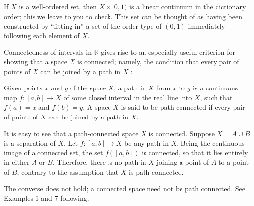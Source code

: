\begin{centeredblock}
\begin{example}
\label{ex:\thesection.\theexample}
 If \(X\) is a well-ordered set, then \(X \times \lbrack 0,1)\) is a linear continuum in the dictionary order; this we leave to you to check. This set can be thought of as having been constructed by ``fitting in'' a set of the order type of \((0,1)\) immediately following each element of \(X\).
\end{example}
\end{centeredblock}

Connectedness of intervals in \(\mathbb{R}\) gives rise to an especially useful criterion for showing that a space \(X\) is connected; namely, the condition that every pair of points of \(X\) can be joined by a path in \(X\) :

\begin{definition}
 Given points \(x\) and \(y\) of the space \(X\), a path in \(X\) from \(x\) to \(y\) is a continuous map \(f : [ {a,b}] \rightarrow X\) of some closed interval in the real line into \(X\), such that \(f( a) = x\) and \(f( b) = y\). A space \(X\) is said to be path connected if every pair of points of \(X\) can be joined by a path in \(X\).
\end{definition}

It is easy to see that a path-connected space \(X\) is connected. Suppose \(X = A \cup B\) is a separation of \(X\). Let \(f : [ {a,b}] \rightarrow X\) be any path in \(X\). Being the continuous image of a connected set, the set \(f( [ {a,b}] )\) is connected, so that it lies entirely in either \(A\) or \(B\). Therefore, there is no path in \(X\) joining a point of \(A\) to a point of \(B\), contrary to the assumption that \(X\) is path connected.

The converse does not hold; a connected space need not be path connected. See Examples 6 and 7 following.

